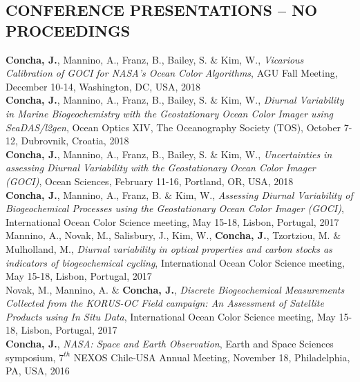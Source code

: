 \documentclass[11pt]{res}
\begin{document}
\begin{resume}
\section{CONFERENCE PRESENTATIONS -- NO PROCEEDINGS}
\vspace{0.1in}
{\bf Concha, J.}, Mannino, A., Franz, B., Bailey, S. $\&$ Kim, W., {\it Vicarious Calibration of GOCI for NASA’s Ocean Color Algorithms}, AGU Fall Meeting, December 10-14, Washington, DC, USA, 2018
\vspace{-0.1in}\\
{\bf Concha, J.}, Mannino, A., Franz, B., Bailey, S. $\&$ Kim, W., {\it Diurnal Variability in Marine Biogeochemistry with the Geostationary Ocean Color Imager using SeaDAS/l2gen}, Ocean Optics XIV, The Oceanography Society (TOS), October 7-12, Dubrovnik, Croatia, 2018
\vspace{0.1in}\\
{\bf Concha, J.}, Mannino, A., Franz, B., Bailey, S. $\&$ Kim, W., {\it Uncertainties in assessing Diurnal Variability with the Geostationary Ocean Color Imager (GOCI)}, Ocean Sciences, February 11-16, Portland, OR, USA, 2018
\vspace{0.1in}\\
{\bf Concha, J.}, Mannino, A., Franz, B. $\&$ Kim, W., {\it Assessing Diurnal Variability of Biogeochemical Processes using the Geostationary Ocean Color Imager (GOCI)}, International Ocean Color Science meeting, May 15-18, Lisbon, Portugal, 2017
\vspace{0.1in}\\
Mannino, A., Novak, M., Salisbury, J., Kim, W., {\bf Concha, J.}, Tzortziou, M. $\&$ Mulholland, M., {\it Diurnal variability in optical properties and carbon stocks as indicators of biogeochemical cycling}, International Ocean Color Science meeting, May 15-18, Lisbon, Portugal, 2017
\vspace{0.1in}\\
Novak, M., Mannino, A. $\&$ {\bf Concha, J.}, {\it Discrete Biogeochemical Measurements Collected from the KORUS-OC Field campaign: An Assessment of Satellite Products using In Situ Data}, International Ocean Color Science meeting, May 15-18, Lisbon, Portugal, 2017
\vspace{0.1in}\\
{\bf Concha, J.}, {\it NASA: Space and Earth Observation}, Earth and Space Sciences symposium, $7^{th}$ NEXOS Chile-USA Annual Meeting, November 18, Philadelphia, PA, USA, 2016
\vspace{0.1in}\\

\end{resume}
\end{document}
